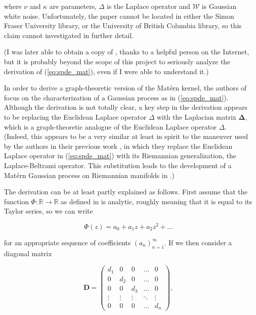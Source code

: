 where $\nu$ and $\kappa$ are parameters, $\Delta$ is the Laplace operator and $\mathcal W$ is Gaussian white noise. Unfortunately, the paper \cite{whittle1963stochastic} cannot be located in either the Simon Fraser University library, or the University of British Columbia library, so this claim cannot investigated in further detail.

(I was later able to obtain a copy of \cite{whittle1963stochastic}, thanks to a helpful person on the Internet, but it is probably beyond the scope of this project to seriously analyze the derivation of (\ref{eq:spde_mat}), even if I were able to understand it.)

In order to derive a graph-theoretic version of the Mat\'{e}rn kernel, the authors of \cite{pmlr-v130-borovitskiy21a} focus on the characterization of a Gaussian process as in (\ref{eq:spde_mat}). Although the derivation is not totally clear, a key step in the derivation appears to be replacing the Euclidean Laplace operator $\Delta$ with the Laplacian matrix $\bm \Delta$, which is a graph-theoretic analogue of the Euclidean Laplace operator $\Delta$. (Indeed, this appears to be a very similar at least in spirit to the maneuver used by the authors in their previous work \cite{NEURIPS2020_92bf5e62}, in which they replace the Euclidean Laplace operator in (\ref{eq:spde_mat}) with its Riemannian generalization, the Laplace-Beltrami operator. This substitution leads to the development of a Mat\'{e}rn Gaussian process on Riemannian manifolds in \cite{NEURIPS2020_92bf5e62}.)

The derivation can be at least partly explained as follows. First assume that the function $\Phi \colon \mathbb R \to \mathbb R$ as defined in \cite{pmlr-v130-borovitskiy21a} is analytic, roughly meaning that it is equal to its Taylor series, so we can write

\begin{equation}\label{eq:phi_1}
    \Phi(z) = a_0 + a_1 z + a_2 z^2 + \dots
\end{equation}

for an appropriate sequence of coefficients $(a_n)_{n = 1}^{\infty}$. If we then consider a diagonal matrix

\[
    \mathbf D = 
    \begin{pmatrix}
        d_1 & 0 & 0 & \ldots & 0 \\
        0 & d_2 & 0 & \ldots & 0 \\
        0 & 0 & d_3 & \ldots & 0 \\
        \vdots & \vdots & \vdots & \ddots & \vdots \\
        0 & 0 & 0 & \ldots & d_n
    \end{pmatrix},
\]


